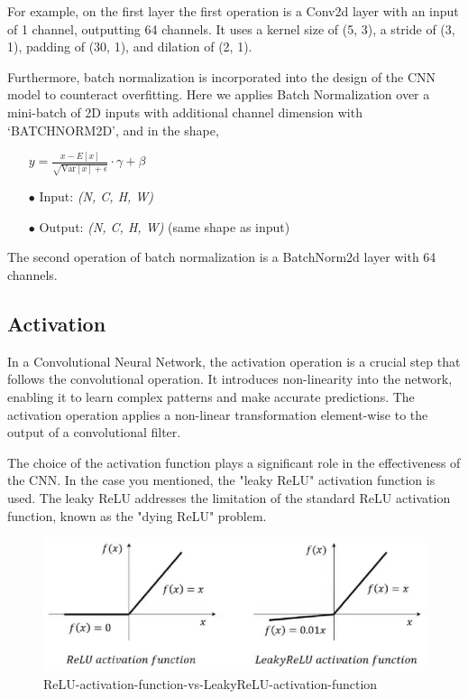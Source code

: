 \documentclass{article}
\begin{document}
For example, on the first layer the first operation is a Conv2d layer with an input of 1 channel, outputting 64 channels. It uses a kernel size of (5, 3), a stride of (3, 1), padding of (30, 1), and dilation of (2, 1).  

Furthermore, batch normalization is incorporated into the design of the CNN model to counteract overfitting. Here we applies Batch Normalization over a mini-batch of 2D inputs with additional channel dimension with ‘BATCHNORM2D’, and in the shape,

\begin{itemize}
    \setlength\itemindent{2em}
    \item[] $y = \frac{{x - E[x]}}{{\sqrt{{\text{{Var}}[x] + \epsilon}}}} \cdot \gamma + \beta$
    
    \item[$\bullet$] Input: \emph{(N, C, H, W)}
    
    \item[$\bullet$] Output: \emph{(N, C, H, W)} (same shape as input)
\end{itemize}
The second operation of batch normalization is a BatchNorm2d layer with 64 channels. 

\subsection{Activation}
In a Convolutional Neural Network, the activation operation is a crucial step that follows the convolutional operation. It introduces non-linearity into the network, enabling it to learn complex patterns and make accurate predictions. The activation operation applies a non-linear transformation element-wise to the output of a convolutional filter.

The choice of the activation function plays a significant role in the effectiveness of the CNN. In the case you mentioned, the "leaky ReLU" activation function is used. The leaky ReLU addresses the limitation of the standard ReLU activation function, known as the "dying ReLU" problem. 

\begin{figure}[H]
	\centering
 \includegraphics[width=0.5\linewidth]{2_3ReLU-activation-function-vs-LeakyReLU-activation-function.jpg}
	\caption{ReLU-activation-function-vs-LeakyReLU-activation-function}
\end{figure}
\end{document}

